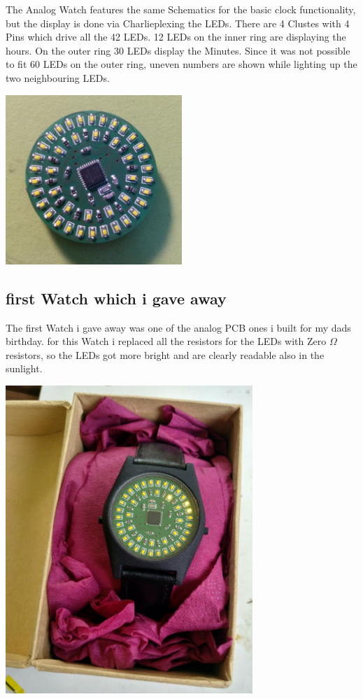 The Analog Watch features the same Schematics for the basic clock functionality, but the display is done via Charlieplexing the LEDs. There are 4 Clustes with 4 Pins which drive all the 42 LEDs. 12 LEDs on the inner ring are displaying the hours. On the outer ring 30 LEDs display the Minutes. Since it was not possible to fit 60 LEDs on the outer ring, uneven numbers are shown while lighting up the two neighbouring LEDs.
\begin{center}
  \includegraphics[width=0.5\textwidth]{../Pictures/AnalogPCB.jpg}
\end{center}
\newpage
\subsection{first Watch which i gave away}
The first Watch i gave away was one of the analog PCB ones i built for my dads birthday.
for this Watch i replaced all the resistors for the LEDs with Zero $\Omega$ resistors, so the LEDs got more bright and are clearly readable also in the sunlight.
\begin{center}
  \includegraphics[width=0.7\textwidth]{../Pictures/AnalogWatch1.jpg}
\end{center}
